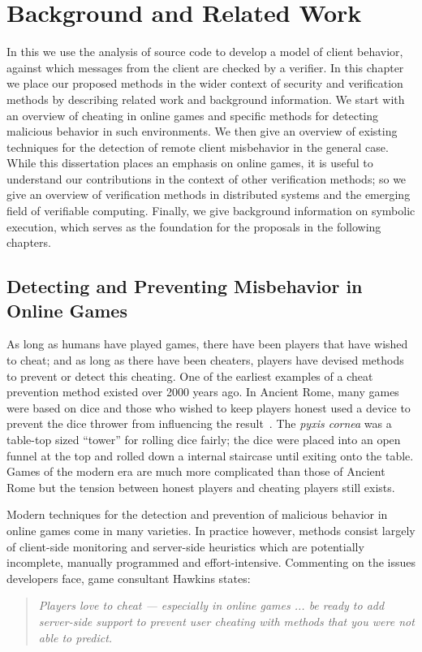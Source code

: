 \chapter{Background and Related Work} 
\label{ch:background}

In this \dissertation we use the analysis of source code to develop a
model of client behavior, against which messages from the
client are checked by a verifier. In this chapter we place our
proposed methods in the wider context of security and verification
methods by describing related work and background information.
We start with an overview of cheating in online games and
specific methods for detecting malicious behavior in such
environments. We then give an overview of existing techniques for the
detection of remote client misbehavior in the general case. While this
dissertation places an emphasis on online games, it is useful to
understand our contributions in the context of other verification
methods; so we give an overview of verification methods in distributed
systems and the emerging field of verifiable computing. Finally,
we give background information on symbolic execution, which serves as
the foundation for the proposals in the following chapters.

\section{Detecting and Preventing Misbehavior in Online Games}

As long as humans have played games, there have been players that have
wished to cheat; and as long as there have been cheaters, players have
devised methods to prevent or detect this cheating. One of the
earliest examples of a cheat prevention method existed over 2000 years
ago. In Ancient Rome, many games were based on dice and those who
wished to keep players honest used a device to prevent the dice
thrower from influencing the result~\cite{lanciani1892}. The
\emph{pyxis cornea} was  a table-top sized ``tower'' for rolling dice
fairly; the dice were placed into an open funnel at the top and rolled
down a internal staircase until exiting onto the table. Games of the
modern era are much more complicated than those of Ancient Rome but the
tension between honest players and cheating players still exists.


Modern techniques for the detection and prevention of malicious
behavior in online games come in many varieties.
In practice however, methods consist largely of
client-side monitoring and server-side heuristics which are
potentially incomplete, manually programmed and effort-intensive.
Commenting on the issues developers face, game consultant Hawkins
states:
\begin{quote}
{\sl Players love to cheat --- especially in online games ... be
ready to add server-side support to prevent user cheating with
methods that you were not able to predict.}~\cite{hawkins03:quote}
\end{quote}

